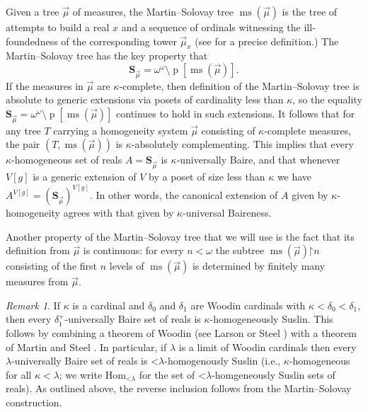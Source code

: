 \documentclass[fleqn, 11pt]{amsart}
\theoremstyle{plain}
\theoremstyle{definition}
\theoremstyle{remark}
\newtheorem{rem}[thm]{Remark} \newtheorem*{rem*}{Remark}
\newcommand{\Hom}{\mathrm{Hom}}
\newcommand{\restrict}{\mathord{\restriction}}
\newcommand{\less}{\mathord{<}}
\DeclareMathOperator{\ms}{ms}
\DeclareMathOperator{\p}{p}
\begin{document}
Given a tree $\vec{\mu}$ of measures, the Martin--Solovay tree $\ms(\vec{\mu})$ is the tree of attempts to build a real $x$ and a sequence of ordinals witnessing the ill-foundedness of the corresponding tower $\vec{\mu}_x$ (see \cite{SteDMT, LarStationaryTower} for a precise definition.) The Martin--Solovay tree has the key property that
\[\textbf{S}_{\vec{\mu}} = \omega^\omega \setminus \p[\ms(\vec{\mu})].\]
If the measures in $\vec{\mu}$ are $\kappa$-complete, then definition of the Martin--Solovay tree is absolute to generic extensions via posets of cardinality less than $\kappa$, so the equality $\textbf{S}_{\vec{\mu}} = \omega^\omega \setminus \p[\ms(\vec{\mu})]$ continues to hold in such extensions. It follows that for any tree $T$ carrying a homogeneity system $\vec{\mu}$ consisting of $\kappa$-complete measures, the pair $(T, \ms(\vec{\mu}))$ is $\kappa$-absolutely complementing. This implies that every $\kappa$-homogeneous set of reals $A = \textbf{S}_{\vec{\mu}}$ is $\kappa$-universally Baire, and that whenever $V[g]$ is a generic extension of $V$ by a poset of size less than $\kappa$ we have $A^{V[g]} = (\textbf{S}_{\vec{\mu}})^{V[g]}$. In other words, the canonical extension of $A$ given by $\kappa$-homogeneity agrees with that given by $\kappa$-universal Baireness. 

Another property of the Martin--Solovay tree that we will use is the fact that its definition from $\vec{\mu}$ is continuous: for every $n<\omega$ the subtree $\ms(\vec{\mu}) \restrict n$ consisting of the first $n$ levels of $\ms(\vec{\mu})$ is determined by finitely many measures from $\vec{\mu}$.

\begin{rem}\label{homubequivrem}
If $\kappa$ is a cardinal and $\delta_0$ and $\delta_1$ are Woodin cardinals with $\kappa < \delta_0 < \delta_1$, then every $\delta_1^+$-universally Baire set of reals is $\kappa$-homogeneously Suslin. This follows by combining a theorem of Woodin (see Larson \cite[Theorem 3.3.8]{LarStationaryTower} or Steel \cite[Theorem 4.1]{SteDMT})
with a theorem of Martin and Steel \cite{MarSteProjDet}.
In particular, if $\lambda$ is a limit of Woodin cardinals then every $\lambda$-universally Baire set of reals is $\mathord{<}\lambda$-homogenously Suslin (i.e., $\kappa$-homogeneous for all $\kappa < \lambda$; we write $\Hom_{\less\lambda}$ for the set of $\less\lambda$-homgeneously Suslin sets of reals). As outlined above, the reverse inclusion follows from the Martin--Solovay construction.
\end{rem}
\end{document}
